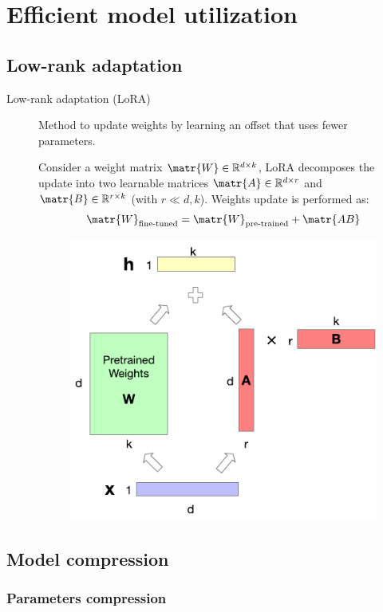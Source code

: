 \chapter{Efficient model utilization}



\section{Low-rank adaptation} \label{sec:lora}

\begin{description}
    \item[Low-rank adaptation (LoRA)] 
        Method to update weights by learning an offset that uses fewer parameters.

        Consider a weight matrix $\matr{W} \in \mathbb{R}^{d \times k}$, LoRA decomposes the update into two learnable matrices $\matr{A} \in \mathbb{R}^{d \times r}$ and $\matr{B} \in \mathbb{R}^{r \times k}$ (with $r \ll d, k$). Weights update is performed as:
        \[ \matr{W}_{\text{fine-tuned}} = \matr{W}_{\text{pre-trained}} + \matr{AB} \]

        \begin{figure}[H]
            \centering
            \includegraphics[width=0.4\linewidth]{./img/_lora.pdf}
        \end{figure}
\end{description}



\section{Model compression}


\subsection{Parameters compression}

